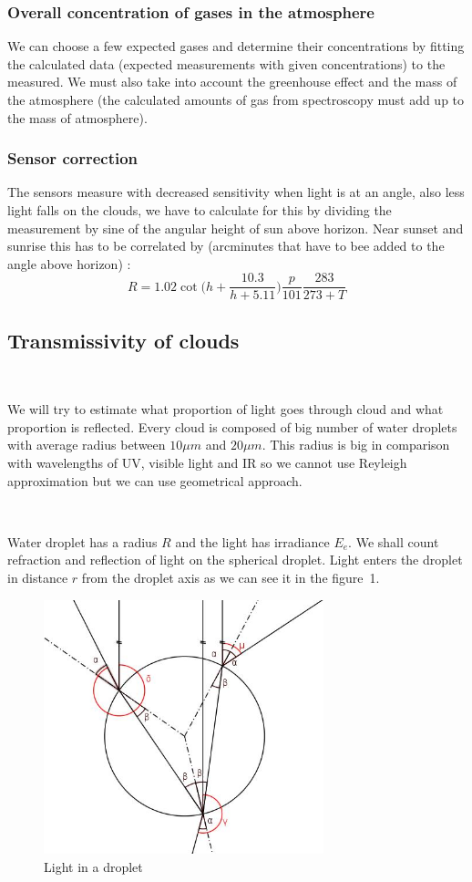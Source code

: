 \documentclass{cfp}
\begin{document}
\subsubsection{Overall concentration of gases in the atmosphere}
We can choose a few expected gases and determine their concentrations by fitting the calculated data (expected measurements with given concentrations) to the measured. We must also take into account the greenhouse effect and the mass of the atmosphere (the calculated amounts of gas from spectroscopy must add up to the mass of atmosphere).
\subsubsection{Sensor correction}
The sensors measure with decreased sensitivity when light is at an angle, also less light falls on the clouds, we have to calculate for this by dividing the measurement by sine of the angular height of sun above horizon. Near sunset and sunrise this has to be correlated by (arcminutes that have to bee added to the angle above horizon) \cite{refra}:
\begin{equation}
    R = 1.02 \cot \bigg( h + \frac{10.3}{h + 5.11} \bigg) \frac{p}{101} \frac{283}{273 + T}
\end{equation}
\subsection{Transmissivity of clouds}

\

We will try to estimate what proportion of light goes through cloud and what proportion is reflected. Every cloud is composed of big number of water droplets with average radius between $10 \mu m$ and $20 \mu m$. This radius is big in comparison with wavelengths of UV, visible light and IR so we cannot use Reyleigh approximation but we can use geometrical approach. 

\

Water droplet has a radius $R$ and the light has irradiance $E_{e}$.  We shall count refraction and reflection of light on the spherical droplet. Light enters the droplet in distance $r$ from the droplet axis as we can see it in the figure~1.

\begin{figure}[h]
\centering
\includegraphics[width=230pt]{droplet.jpg}
\caption{Light in a droplet}
\end{figure}
\end{document}
